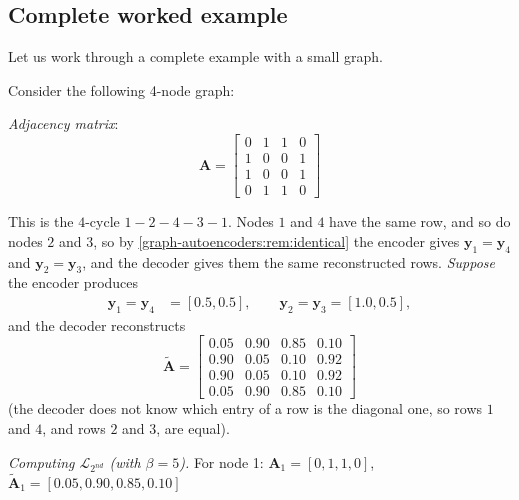 \begin{notechapter}
\section{Complete worked example}

Let us work through a complete example with a small graph.

\begin{example}
Consider the following 4-node graph:

\begin{center}
\end{center}

\emph{Adjacency matrix}:
\[
\bm{A} = \begin{bmatrix}
0 & 1 & 1 & 0 \\
1 & 0 & 0 & 1 \\
1 & 0 & 0 & 1 \\
0 & 1 & 1 & 0
\end{bmatrix}
\]

This is the $4$-cycle $1 - 2 - 4 - 3 - 1$. Nodes $1$ and $4$ have the same row, and so do nodes $2$ and $3$, so by \cref{graph-autoencoders:rem:identical} the encoder gives $\bm y_1 = \bm y_4$ and $\bm y_2 = \bm y_3$, and the decoder gives them the same reconstructed rows. \emph{Suppose} the encoder produces
\begin{align*}
\bm{y}_1 = \bm y_4 &= [0.5, 0.5], \qquad
\bm{y}_2 = \bm y_3 = [1.0, 0.5],
\end{align*}
and the decoder reconstructs
\[
\tilde{\bm{A}} = \begin{bmatrix}
0.05 & 0.90 & 0.85 & 0.10 \\
0.90 & 0.05 & 0.10 & 0.92 \\
0.90 & 0.05 & 0.10 & 0.92 \\
0.05 & 0.90 & 0.85 & 0.10
\end{bmatrix}
\]
(the decoder does not know which entry of a row is the diagonal one, so rows $1$ and $4$, and rows $2$ and $3$, are equal).

\emph{Computing $\mathcal{L}_{2^{nd}}$ (with $\beta = 5$).}
For node 1: $\bm{A}_1 = [0, 1, 1, 0]$, $\tilde{\bm{A}}_1 = [0.05, 0.90, 0.85, 0.10]$


\end{example}
\end{notechapter}
